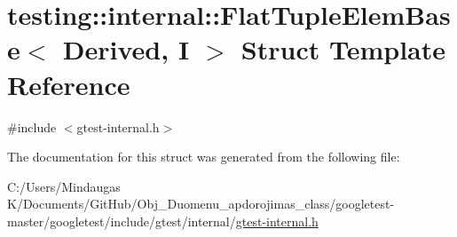 \hypertarget{structtesting_1_1internal_1_1_flat_tuple_elem_base}{}\section{testing\+::internal\+::Flat\+Tuple\+Elem\+Base$<$ Derived, I $>$ Struct Template Reference}
\label{structtesting_1_1internal_1_1_flat_tuple_elem_base}


{\ttfamily \#include $<$gtest-\/internal.\+h$>$}



The documentation for this struct was generated from the following file\+:\begin{DoxyCompactItemize}
\item 
C\+:/\+Users/\+Mindaugas K/\+Documents/\+Git\+Hub/\+Obj\+\_\+\+Duomenu\+\_\+apdorojimas\+\_\+class/googletest-\/master/googletest/include/gtest/internal/\mbox{\hyperlink{googletest-master_2googletest_2include_2gtest_2internal_2gtest-internal_8h}{gtest-\/internal.\+h}}\end{DoxyCompactItemize}
